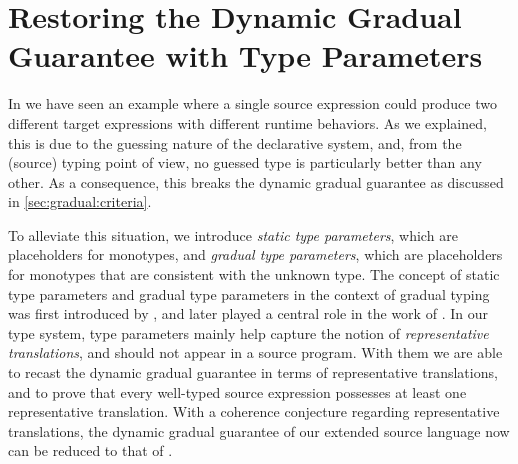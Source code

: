 \chapter{Restoring the Dynamic Gradual Guarantee with Type Parameters}
\label{chap:Dynamic}

In  we have seen an example where a single source expression could
produce two different target expressions with different runtime behaviors. As we
explained, this is due to the guessing nature of the declarative system, and,
from the (source) typing point of view, no guessed type is particularly better than 
any other. As a consequence, this breaks the dynamic gradual guarantee as discussed in \cref{sec:gradual:criteria}.

To alleviate this situation, we introduce \textit{static type parameters}, which
are placeholders for monotypes, and \textit{gradual type parameters}, which are
placeholders for monotypes that are consistent with the unknown type. The
concept of static type parameters and gradual type parameters in the context of
gradual typing was first introduced by \citet{garcia:principal}, and later
played a central role in the work of \citet{yuu2017poly}. In our type system,
type parameters mainly help capture the notion of \textit{representative
  translations}, and should not appear in a source program.
With them we are able to recast the dynamic gradual guarantee in terms
of representative translations, and to prove that every well-typed source expression
possesses at least one representative translation. With a
coherence conjecture regarding representative translations, the dynamic gradual
guarantee of our extended source language now can be reduced to that of \pbc.




